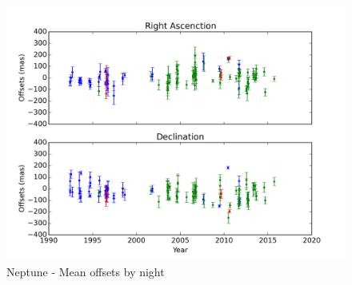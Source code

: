 \documentclass[12pt,a4paper]{report}
\begin{document}


\begin{figure}[H]
\includegraphics[width=15.0cm]{Neptune_offsets.png} 
\caption{Neptune - Mean offsets by night}
\label{Fig:netuno-media}
\end{figure}
\end{document}
